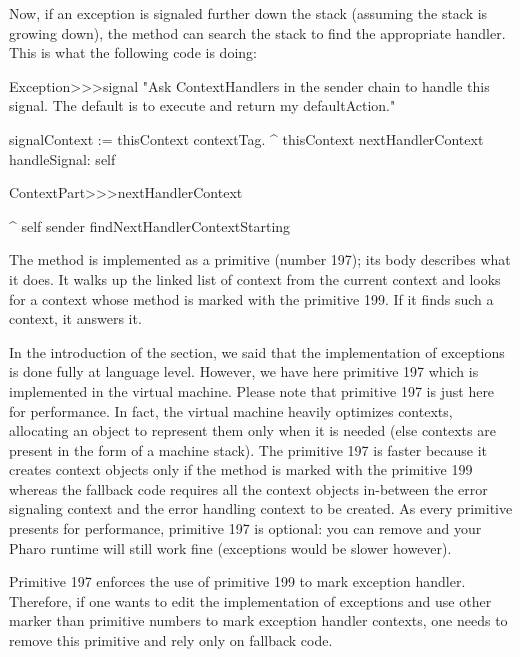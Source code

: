 Now, if an exception is signaled further down the stack (assuming the stack is growing down), the method  can search the stack to find the appropriate handler. This is what the following code is doing:

\begin{code}{}
Exception>>>signal
	"Ask ContextHandlers in the sender chain to handle this signal.
	The default is to execute and return my defaultAction."

	signalContext := thisContext contextTag.
	^ thisContext nextHandlerContext handleSignal: self
\end{code}

\begin{code}{}
ContextPart>>>nextHandlerContext

	^ self sender findNextHandlerContextStarting
\end{code}

The method  is implemented as a primitive (number 197); its body describes what it does. It walks up the linked list of context from the current context and looks for a context whose method is marked with the  primitive 199. If it finds such a context, it answers it.

In the introduction of the section, we said that the implementation of exceptions is done fully at language level. However, we have here primitive 197 which is implemented in the virtual machine. Please note that primitive 197 is just here for performance. In fact, the virtual machine heavily optimizes contexts, allocating an object to represent them only when it is needed (else contexts are present in the form of a machine stack). The primitive 197 is faster because it creates context objects only if the method is marked with the  primitive 199 whereas the fallback code requires all the context objects in-between the error signaling context and the error handling context to be created. As every primitive presents for performance, primitive 197 is optional: you can remove   and your Pharo runtime will still work fine (exceptions would be slower however).

Primitive 197 enforces the use of primitive 199 to mark exception handler. Therefore, if one wants to edit the implementation of exceptions and use other marker than primitive numbers to mark exception handler contexts, one needs to remove this primitive and rely only on fallback code. 

